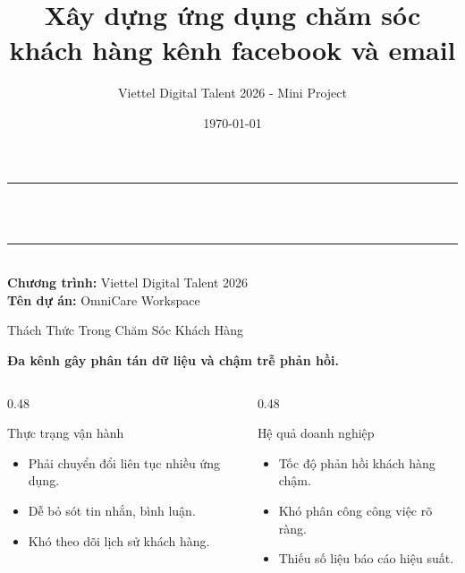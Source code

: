 \documentclass[aspectratio=169, 10pt]{beamer}
\title{Xây dựng ứng dụng chăm sóc khách hàng kênh facebook và email}
\subtitle{}
\author{Viettel Digital Talent 2026 - Mini Project}
\date{\today}
\begin{document}
\begin{frame}[plain]
    \begin{center}
        \vspace{1.5cm}
        {\color{accent}\rule{\linewidth}{1.5pt}} \\[0.4cm]
        {\inserttitle} \\[0.4cm]
        {\color{accent}\rule{\linewidth}{1.5pt}} \\[1cm]
        \textbf{Chương trình:} Viettel Digital Talent 2026 \\[0.1cm]
        \textbf{Tên dự án:} OmniCare Workspace \\[0.1cm]
    \end{center}
\end{frame}

\begin{frame}{Thách Thức Trong Chăm Sóc Khách Hàng}
    \begin{center}
        \large\textbf{\color{accent}Đa kênh gây phân tán dữ liệu và chậm trễ phản hồi.}
    \end{center}
    \vspace{0.4cm}
    \begin{columns}[T]
        \begin{column}{0.48\textwidth}
            \begin{block}{Thực trạng vận hành}
                \begin{itemize}
                    \item Phải chuyển đổi liên tục nhiều ứng dụng.
                    \item Dễ bỏ sót tin nhắn, bình luận.
                    \item Khó theo dõi lịch sử khách hàng.
                \end{itemize}
            \end{block}
        \end{column}
        
        \begin{column}{0.48\textwidth}
            \begin{block}{Hệ quả doanh nghiệp}
                \begin{itemize}
                    \item Tốc độ phản hồi khách hàng chậm.
                    \item Khó phân công công việc rõ ràng.
                    \item Thiếu số liệu báo cáo hiệu suất.
                \end{itemize}
            \end{block}
        \end{column}
    \end{columns}
\end{frame}
\end{document}
